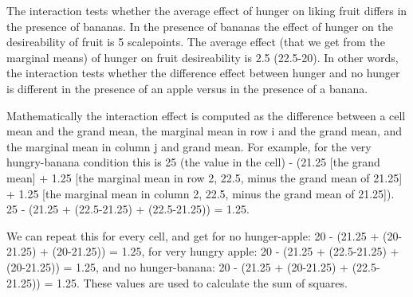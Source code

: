 \documentclass[]{book}
\begin{document}
The interaction tests whether the average effect of hunger on liking fruit differs in the presence of bananas. In the presence of bananas the effect of hunger on the desireability of fruit is 5 scalepoints. The average effect (that we get from the marginal means) of hunger on fruit desireability is 2.5 (22.5-20). In other words, the interaction tests whether the difference effect between hunger and no hunger is different in the presence of an apple versus in the presence of a banana.

Mathematically the interaction effect is computed as the difference between a cell mean and the grand mean, the marginal mean in row i and the grand mean, and the marginal mean in column j and grand mean. For example, for the very hungry-banana condition this is 25 (the value in the cell) - (21.25 {[}the grand mean{]} + 1.25 {[}the marginal mean in row 2, 22.5, minus the grand mean of 21.25{]} + 1.25 {[}the marginal mean in column 2, 22.5, minus the grand mean of 21.25{]}). 25 - (21.25 + (22.5-21.25) + (22.5-21.25)) = 1.25.

We can repeat this for every cell, and get for no hunger-apple: 20 - (21.25 + (20-21.25) + (20-21.25)) = 1.25, for very hungry apple: 20 - (21.25 + (22.5-21.25) + (20-21.25)) = 1.25, and no hunger-banana: 20 - (21.25 + (20-21.25) + (22.5-21.25)) = 1.25. These values are used to calculate the sum of squares.
\end{document}
